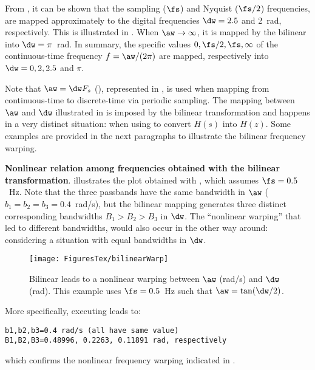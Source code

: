 From , it can be shown that the sampling ($\fs$) and Nyquist ($\fs/2$) frequencies, are mapped approximately to the digital frequencies $\dw=2.5$ and 2~rad, respectively. This is illustrated in .
When  $\aw \rightarrow \infty$, it is mapped by the bilinear into $\dw = \pi$~rad. In summary,
the specific values $ 0, \fs/2, \fs, \infty$  of the continuous-time frequency $f=\aw/(2\pi)$ are mapped, respectively into $\dw=0, 2, 2.5$ and $\pi$.

Note that $\aw = \dw F_s$ (), represented in , is used when mapping from continuous-time to discrete-time via periodic sampling. The mapping between $\aw$ and $\dw$ illustrated in  is imposed by the bilinear transformation and happens in a very distinct situation: when using  to convert $H(s)$ into $H(z)$. Some examples are provided in the next paragraphs to illustrate the bilinear frequency warping.

\bExample \textbf{Nonlinear relation among frequencies obtained with the bilinear transformation}.
 illustrates the plot obtained with , which
assumes $\fs=0.5$~Hz. Note that the three passbands have the same bandwidth in $\aw$ ($b_1=b_2=b_3=0.4$~rad/s), but the bilinear mapping generates three distinct corresponding bandwidths $B_1 > B_2 > B_3$ in $\dw$.
The ``nonlinear warping'' that led to different bandwidths, would also occur in the other way around: considering a situation with equal bandwidths in $\dw$.

\begin{figure}
\centering
\texttt{[image: FiguresTex/bilinearWarp]}
\caption{Bilinear leads to a nonlinear warping between $\aw$ (rad/s) and $\dw$ (rad).
This example uses $\fs=0.5$~Hz such that $\aw=\tan(\dw/2)$.\label{fig:bilinearWarp}}
\end{figure}


More specifically, executing  leads to:
\begin{verbatim}
b1,b2,b3=0.4 rad/s (all have same value)
B1,B2,B3=0.48996, 0.2263, 0.11891 rad, respectively
\end{verbatim}
which confirms the nonlinear frequency warping indicated in .
\eExample 

